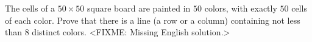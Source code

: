 \problem{}
The cells of a $50 \times 50$ square board are painted in $50$ colors, with
exactly $50$ cells of each color.
Prove that there is a line (a row or a column) containing not less than $8$
distinct colors.
\solution
<FIXME: Missing English solution.>
\endproblem
